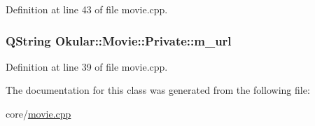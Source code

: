 Definition at line 43 of file movie.\+cpp.

\hypertarget{classMovie_1_1Private_a4854a7b3f3c477551174018976eb794f}{
\subsubsection[{m\+\_\+url}]{\setlength{\rightskip}{0pt plus 5cm}Q\+String Okular\+::\+Movie\+::\+Private\+::m\+\_\+url}}\label{classMovie_1_1Private_a4854a7b3f3c477551174018976eb794f}


Definition at line 39 of file movie.\+cpp.



The documentation for this class was generated from the following file\+:\begin{DoxyCompactItemize}
\item 
core/\hyperlink{movie_8cpp}{movie.\+cpp}\end{DoxyCompactItemize}
